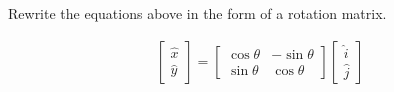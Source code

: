 Rewrite the equations above in the form of a rotation matrix.

\begin{solution}
\begin{align*}
    \begin{bmatrix}\hat{x} \\ \hat{y}\end{bmatrix} =
    \begin{bmatrix}
        \cos\theta & -\sin\theta \\
        \sin\theta & \cos\theta
    \end{bmatrix} \begin{bmatrix}
        \hat{i} \\ \hat{j}
    \end{bmatrix}
\end{align*}
\end{solution}
